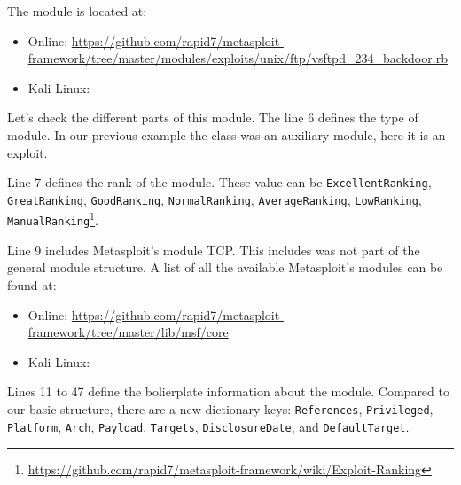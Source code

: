 The module is located at:

\begin{itemize}
    \item Online: \url{https://github.com/rapid7/metasploit-framework/tree/master/modules/exploits/unix/ftp/vsftpd_234_backdoor.rb}
    \item Kali Linux: 
\end{itemize}

Let's check the different parts of this module. The line 6 defines the type of module. In our previous example the class was an auxiliary module, here it is an exploit.

\begin{listingbox}
    
\end{listingbox}

Line 7 defines the rank of the module. These value can be \texttt{ExcellentRanking}, \texttt{GreatRanking}, \texttt{GoodRanking}, \texttt{NormalRanking}, \texttt{AverageRanking}, \texttt{LowRanking}, \texttt{ManualRanking}\footnote{\url{https://github.com/rapid7/metasploit-framework/wiki/Exploit-Ranking}}.

\begin{listingbox}
    
\end{listingbox}

Line 9 includes Metasploit's module TCP. This includes was not part of the general module structure. A list of all the available Metasploit's modules can be found at:

\begin{itemize}
    \item Online: \url{https://github.com/rapid7/metasploit-framework/tree/master/lib/msf/core}
    \item Kali Linux: 
\end{itemize}

\begin{listingbox}
    
\end{listingbox}

Lines 11 to 47 define the bolierplate information about the module. Compared to our basic structure, there are a new dictionary keys: \texttt{References}, \texttt{Privileged}, \texttt{Platform}, \texttt{Arch}, \texttt{Payload}, \texttt{Targets}, \texttt{DisclosureDate}, and \texttt{DefaultTarget}.

